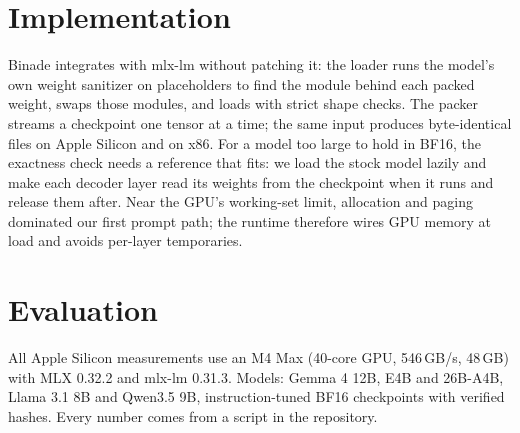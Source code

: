 \documentclass[11pt]{article}
\begin{document}
\section{Implementation}

Binade integrates with mlx-lm without patching it: the loader runs the model's own weight sanitizer on placeholders to find the module behind each packed weight, swaps those modules, and loads with strict shape checks. The packer streams a checkpoint one tensor at a time; the same input produces byte-identical files on Apple Silicon and on x86. For a model too large to hold in BF16, the exactness check needs a reference that fits: we load the stock model lazily and make each decoder layer read its weights from the checkpoint when it runs and release them after. Near the GPU's working-set limit, allocation and paging dominated our first prompt path; the runtime therefore wires GPU memory at load and avoids per-layer temporaries.

\section{Evaluation}
\label{sec:eval}

All Apple Silicon measurements use an M4 Max (40-core GPU, 546\,GB/s, 48\,GB) with MLX 0.32.2 and mlx-lm 0.31.3. Models: Gemma 4 12B, E4B and 26B-A4B, Llama 3.1 8B and Qwen3.5 9B, instruction-tuned BF16 checkpoints with verified hashes. Every number comes from a script in the repository.
\end{document}
